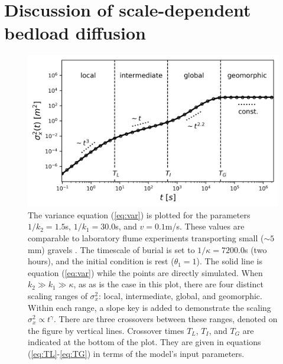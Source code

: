\documentclass[]{agujournal2018}
\begin{document}
\section{Discussion of scale-dependent bedload diffusion}
\label{sec:discussion}
\begin{figure}[t]	
	\includegraphics[width=\linewidth,keepaspectratio]{./figures/diffusion.png}
	\caption{The variance equation (\ref{eq:var}) is plotted for the parameters $1/k_2 = 1.5$s, $1/k_1 = 30.0$s, and $v=0.1$m/s. These values are comparable to laboratory flume experiments transporting small ($\sim 5$mm) gravels \citep[cf.][]{Lajeunesse2010,Martin2012}. The timescale of burial is set to $1/\kappa = 7200.0$s (two hours), and the initial condition is rest ($\theta_1=1$). The solid line is equation (\ref{eq:var}) while the points are directly simulated. When $k_2\gg k_1 \gg \kappa$, as as is the case in this plot, there are four distinct scaling ranges of $\sigma_x^2$: local, intermediate, global, and geomorphic. Within each range, a slope key is added to demonstrate the scaling $\sigma_x^2 \propto t^\gamma$. There are three crossovers between these ranges, denoted on the figure by vertical lines. Crossover times $T_L$, $T_I$, and $T_G$ are indicated at the bottom of the plot. They are given in equations (\ref{eq:TL}-\ref{eq:TG}) in terms of the model's input parameters. }
	\label{fig:var}
\end{figure}
\end{document}
